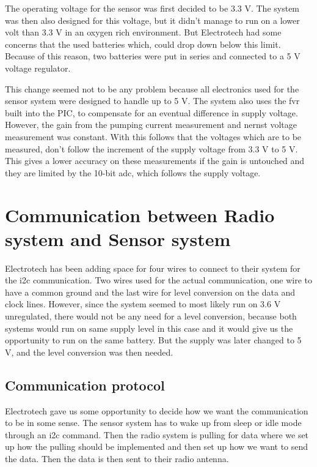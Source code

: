 The operating voltage for the sensor was first decided to be 3.3 V. The system was then also designed for this voltage, but it didn't manage to run on a lower volt than 3.3 V in an oxygen rich environment. But Electrotech had some concerns that the used batteries which, could drop down below this limit. Because of this reason, two batteries were put in series and connected to a 5 V voltage regulator.

This change seemed not to be any problem because all electronics used for the sensor system were designed to handle up to 5 V. The system also uses the \ac{fvr} built into the PIC, to compensate for an eventual difference in supply voltage. However, the gain from the pumping current measurement and nernst voltage measurement was constant. With this follows that the voltages which are to be measured, don't follow the increment of the supply voltage from 3.3 V to 5 V. This gives a lower accuracy on these measurements if the gain is untouched and they are limited by the 10-bit \ac{adc}, which follows the supply voltage. 


\section{Communication between Radio system and Sensor system}

Electrotech has been adding space for four wires to connect to their system for the \ac{i2c} communication. Two wires used for the actual communication, one wire to have a common ground and the last wire for level conversion on the data and clock lines. However, since the system seemed to most likely run on 3.6 V unregulated, there would not be any need for a level conversion, because both systems would run on same supply level in this case and it would give us the opportunity to run on the same battery. But the supply was later changed to 5 V, and the level conversion was then needed.

\subsection{Communication protocol}

Electrotech gave us some opportunity to decide how we want the communication to be in some sense. The sensor system has to wake up from sleep or idle mode through an \ac{i2c} command. Then the radio system is pulling for data where we set up how the pulling should be implemented and then set up how we want to send the data. Then the data is then sent to their radio antenna.

